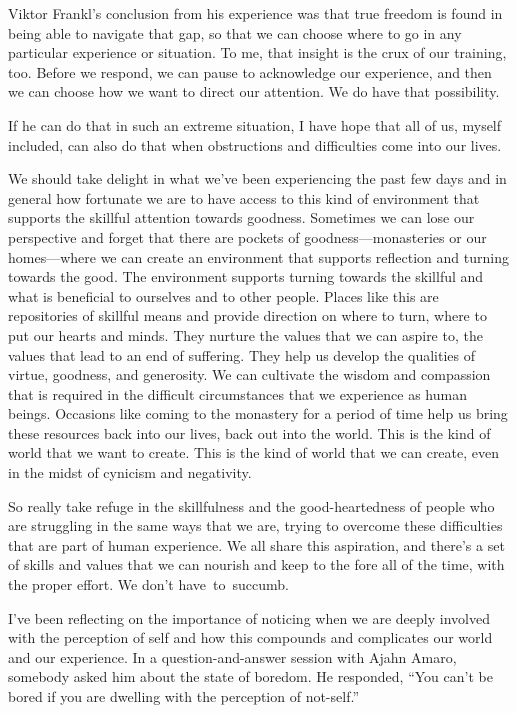 Viktor Frankl's conclusion from his experience was that true freedom is found in being able to navigate that gap, so that we can choose where to go in any particular experience or situation. To me, that insight is the crux of our training, too. Before we respond, we can pause to acknowledge our experience, and then we can choose how we want to direct our attention. We do have that possibility.

If he can do that in such an extreme situation, I have hope that all of us, myself included, can also do that when obstructions and difficulties come into our lives.

We should take delight in what we've been experiencing the past few days and in general how fortunate we are to have access to this kind of environment that supports the skillful attention towards goodness. Sometimes we can lose our perspective and forget that there are pockets of goodness---monasteries or our homes---where we can create an environment that supports reflection and turning towards the good. The environment supports turning towards the skillful and what is beneficial to ourselves and to other people. Places like this are repositories of skillful means and provide direction on where to turn, where to put our hearts and minds. They nurture the values that we can aspire to, the values that lead to an end of suffering. They help us develop the qualities of virtue, goodness, and generosity. We can cultivate the wisdom and compassion that is required in the difficult circumstances that we experience as human beings. Occasions like coming to the monastery for a period of time help us bring these resources back into our lives, back out into the world. This is the kind of world that we want to create. This is the kind of world that we can create, even in the midst of cynicism and negativity.

So really take refuge in the skillfulness and the good-heartedness of people who are struggling in the same ways that we are, trying to overcome these difficulties that are part of human experience. We all share this aspiration, and there's a set of skills and values that we can nourish and keep to the fore all of the time, with the proper effort. We don't \mbox{have to succumb.}

I've been reflecting on the importance of noticing when we are deeply involved with the perception of self and how this compounds and complicates our world and our experience. In a question-and-answer session with Ajahn Amaro, somebody asked him about the state of boredom. He responded, ``You can't be bored if you are dwelling with the perception of not-self.''

